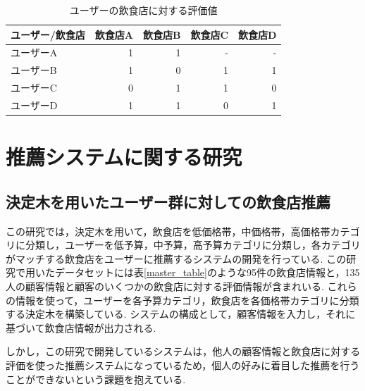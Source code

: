 \documentclass[12pt,a4j]{jreport}
\begin{document}
\begin{table}[htbp]
  \begin{center}
    \begin{tabular}{|l|r|r|r|r|}\hline
      \textbf{ユーザー/飲食店} & 飲食店A & 飲食店B & 飲食店C & 飲食店D \\ \hline
      ユーザーA       & 1        & 1        & -        & - \\ \hline
      ユーザーB       & 1        & 0        & 1        & 1 \\ \hline
      ユーザーC       & 0        & 1        & 1        & 0 \\ \hline
      ユーザーD       & 1        & 1        & 0        & 1 \\ \hline
    \end{tabular}
  \end{center}
  \caption{ユーザーの飲食店に対する評価値}
  \label{rate_coll_table}
\end{table}

\section{推薦システムに関する研究}
\subsection{決定木を用いたユーザー群に対しての飲食店推薦\cite{a}}
この研究では，決定木を用いて，飲食店を低価格帯，中価格帯，高価格帯カテゴリに分類し，ユーザーを低予算，中予算，高予算カテゴリに分類し，各カテゴリがマッチする飲食店をユーザーに推薦するシステムの開発を行っている.
この研究で用いたデータセットには表\ref{master_table}のような95件の飲食店情報と，135人の顧客情報と顧客のいくつかの飲食店に対する評価情報が含まれいる.
これらの情報を使って，ユーザーを各予算カテゴリ，飲食店を各価格帯カテゴリに分類する決定木を構築している.
システムの構成として，顧客情報を入力し，それに基づいて飲食店情報が出力される.

しかし，この研究で開発しているシステムは，他人の顧客情報と飲食店に対する評価を使った推薦システムになっているため，個人の好みに着目した推薦を行うことができないという課題を抱えている.\\
\end{document}
